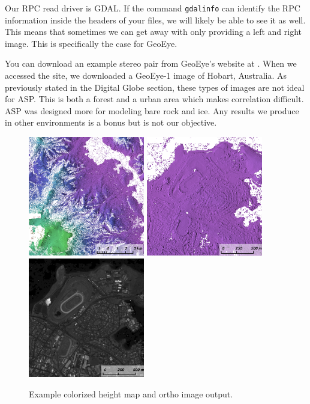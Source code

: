 Our RPC read driver is GDAL. If the command \texttt{gdalinfo} can identify
the RPC information inside the headers of your files, we will likely
be able to see it as well. This means that sometimes we can get away
with only providing a left and right image. This is specifically the
case for GeoEye.

You can download an example stereo pair from GeoEye's website at
\cite{geoeye:samples}. When we accessed the site, we downloaded a
GeoEye-1 image of Hobart, Australia. As previously stated in the
Digital Globe section, these types of images are not ideal for
\ac{ASP}. This is both a forest and a urban area which makes
correlation difficult. \ac{ASP} was designed more for modeling bare rock
and ice. Any results we produce in other environments is a bonus but
is not our objective.

\begin{figure}[h!]
\centering
  \includegraphics[width=2.0in]{images/examples/geoeye/GeoEye_ContextRender.png}
  \includegraphics[width=2.0in]{images/examples/geoeye/GeoEye_CloseUp.png}
  \includegraphics[width=2.0in]{images/examples/geoeye/GeoEye_CloseUpDRG.png}
\caption{Example colorized height map and ortho image output.}
\label{fig:geoeye-nomap-example}
\end{figure}

